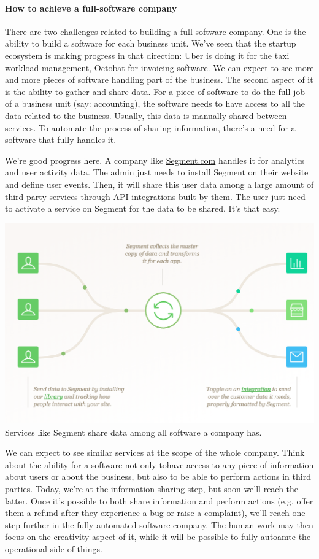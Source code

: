 \documentclass[12pt]{article}
\begin{document}
\paragraph{How to achieve a full-software company}

There are two challenges related to building a full software company.
One is the ability to build a software for each business unit. We've seen that the startup ecosystem is making progress in that direction: Uber is doing it for the taxi workload management, Octobat for invoicing software. We can expect to see more and more pieces of software handling part of the business.
The second aspect of it is the ability to gather and share data. For a piece of software to do the full job of a business unit (say: accounting), the software needs to have access to all the data related to the business. Usually, this data is manually shared between services. To automate the process of sharing information, there's a need for a software that fully handles it.

We're good progress here. A company like \href{https://segment.com/}{Segment.com} handles it for analytics and user activity data. The admin just needs to install Segment on their website and define user events. Then, it will share this user data among a large amount of third party services through API integrations built by them. The user just need to activate a service on Segment for the data to be shared. It's that easy.

\smallskip
\includegraphics[width=\textwidth]{segment}
Services like Segment share data among all software a company has.

\smallskip

We can expect to see similar services at the scope of the whole company. Think about the ability for a software not only tohave access to any piece of information about users or about the business, but also to be able to perform actions in third parties. Today, we're at the information sharing step, but soon we'll reach the latter.
Once it's possible to both share information and perform actions (e.g. offer them a refund after they experience a bug or raise a complaint), we'll reach one step further in the fully automated software company.
The human work may then focus on the creativity aspect of it, while it will be possible to fully autoamte the operational side of things.
\end{document}
